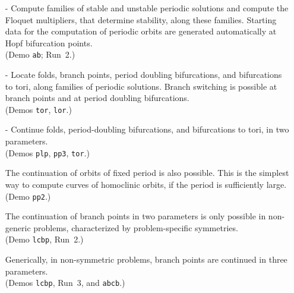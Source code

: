 \documentclass[12pt]{report}
\begin{document}
\begin{itemize}
\item[-]
  Compute families of stable and unstable periodic
  solutions and
  compute the Floquet multipliers, that determine stability, along
  these families.
  Starting data for the computation of periodic orbits are
  generated automatically at Hopf bifurcation points. \\
  (Demo {\tt ab}; Run~2.)
\item[-]
  Locate folds, branch points, period doubling bifurcations,
  and bifurcations to tori, along families of periodic solutions. 
  Branch switching is possible at branch points and at period 
  doubling bifurcations.  \\
  (Demos {\tt tor}, {\tt lor}.)
\item[-]  Continue folds, period-doubling bifurcations,
  and bifurcations to tori, in two parameters. \\
  (Demos {\tt plp}, {\tt pp3}, {\tt tor}.)

  The continuation of orbits of fixed period is also
  possible. This is the simplest way to compute curves of
  homoclinic orbits, if the period is sufficiently large. \\
  (Demo {\tt pp2}.)

  The continuation of branch points in two parameters is only possible
  in non-generic problems, characterized by problem-specific symmetries.\\
  (Demo {\tt lcbp}, Run~2.)

  Generically, in non-symmetric problems, branch points are continued
  in three parameters.\\
  (Demos {\tt lcbp}, Run~3, and {\tt abcb}.)


\end{itemize}
\end{document}
